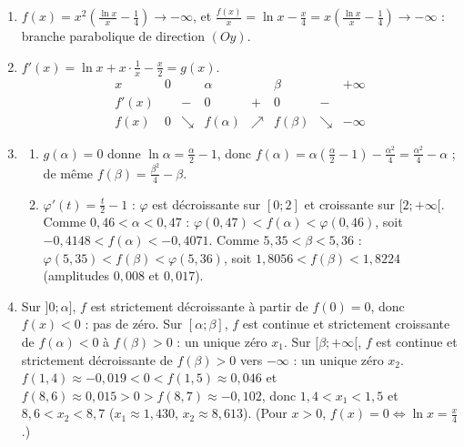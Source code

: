 \begin{corrige}
\begin{sol}
\begin{description}
\begin{enumerate}
      \item $f(x) = x^2\left( \frac{\ln x}{x} - \frac{1}{4} \right) \to -\infty$, et $\frac{f(x)}{x} = \ln x - \frac{x}{4} = x\left( \frac{\ln x}{x} - \frac{1}{4} \right) \to -\infty$ :
            branche parabolique de direction $(Oy)$.
      \item $f'(x) = \ln x + x \cdot \frac{1}{x} - \frac{x}{2} = g(x)$.
            \[
            \begin{array}{c|ccccccc}
            x & 0 & & \alpha & & \beta & & +\infty \\ \hline
            f'(x) & & - & 0 & + & 0 & - & \\ \hline
            f(x) & 0 & \searrow & f(\alpha) & \nearrow & f(\beta) & \searrow & -\infty
            \end{array}
            \]
      \item \begin{enumerate}
            \item $g(\alpha) = 0$ donne $\ln \alpha = \frac{\alpha}{2} - 1$, donc
                  $f(\alpha) = \alpha\left( \frac{\alpha}{2} - 1 \right) - \frac{\alpha^2}{4} = \boxed{\frac{\alpha^2}{4} - \alpha}$ ;
                  de m\^eme $\boxed{f(\beta) = \frac{\beta^2}{4} - \beta}$.
            \item $\varphi'(t) = \frac{t}{2} - 1$ : $\varphi$ est d\'ecroissante sur $[0 ; 2]$ et croissante sur $[2 ; +\infty[$.
                  Comme $0{,}46 < \alpha < 0{,}47$ : $\varphi(0{,}47) < f(\alpha) < \varphi(0{,}46)$, soit
                  $\boxed{-0{,}4148 < f(\alpha) < -0{,}4071}$.
                  Comme $5{,}35 < \beta < 5{,}36$ : $\varphi(5{,}35) < f(\beta) < \varphi(5{,}36)$, soit
                  $\boxed{1{,}8056 < f(\beta) < 1{,}8224}$ (amplitudes $0{,}008$ et $0{,}017$).
            \end{enumerate}
      \item Sur $]0 ; \alpha]$, $f$ est strictement d\'ecroissante \`a partir de $f(0) = 0$, donc $f(x) < 0$ : pas de z\'ero.
            Sur $[\alpha ; \beta]$, $f$ est continue et strictement croissante de $f(\alpha) < 0$ \`a $f(\beta) > 0$ : un unique z\'ero $x_1$.
            Sur $[\beta ; +\infty[$, $f$ est continue et strictement d\'ecroissante de $f(\beta) > 0$ vers $-\infty$ : un unique z\'ero $x_2$.
            $f(1{,}4) \approx -0{,}019 < 0 < f(1{,}5) \approx 0{,}046$ et $f(8{,}6) \approx 0{,}015 > 0 > f(8{,}7) \approx -0{,}102$,
            donc $1{,}4 < x_1 < 1{,}5$ et $8{,}6 < x_2 < 8{,}7$ ($x_1 \approx 1{,}430$, $x_2 \approx 8{,}613$).
            (Pour $x > 0$, $f(x) = 0 \iff \ln x = \frac{x}{4}$.)

\end{enumerate}
\end{description}
\end{sol}
\end{corrige}
